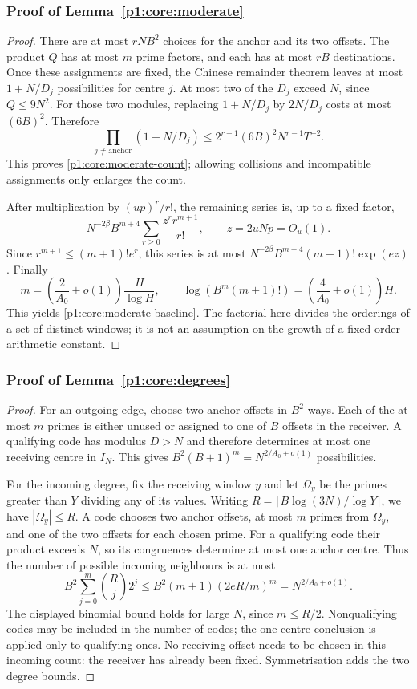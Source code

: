 \subsubsection{Proof of Lemma~\ref{p1:core:moderate}}
\label{p14:comp:certificate-moderate}

\begin{proof}
There are at most $rNB^2$ choices for the anchor and its two offsets.
The product $Q$ has at most $m$ prime factors, and each has at most
$rB$ destinations. Once these assignments are fixed, the Chinese
remainder theorem leaves at most $1+N/D_j$ possibilities for centre
$j$. At most two of the $D_j$ exceed $N$, since $Q\le9N^2$.
For those two modules, replacing $1+N/D_j$ by $2N/D_j$ costs at most
$(6B)^2$. Therefore
\[
 \prod_{j\ne\mathrm{anchor}}(1+N/D_j)
 \le 2^{r-1}(6B)^2N^{r-1}T^{-2}.
\]
This proves \eqref{p1:core:moderate-count}; allowing collisions and
incompatible assignments only enlarges the count.

After multiplication by $(up)^r/r!$, the remaining series is, up to
a fixed factor,
\[
 N^{-2\beta}B^{m+4}\sum_{r\ge0}\frac{z^r r^{m+1}}{r!},
 \qquad z=2uNp=O_u(1).
\]
Since $r^{m+1}\le(m+1)!e^r$, this series is at most
$N^{-2\beta}B^{m+4}(m+1)!\exp(ez)$. Finally
\[
 m=\left(\frac2{A_0}+o(1)\right)\frac{H}{\log H},\qquad
 \log(B^m(m+1)!)=\left(\frac4{A_0}+o(1)\right)H.
\]
This yields \eqref{p1:core:moderate-baseline}. The factorial here
divides the orderings of a set of distinct windows; it is not an
assumption on the growth of a fixed-order arithmetic constant.
\end{proof}

\subsubsection{Proof of Lemma~\ref{p1:core:degrees}}
\label{p14:comp:certificate-degrees}

\begin{proof}
For an outgoing edge, choose two anchor offsets in $B^2$ ways. Each of
the at most $m$ primes is either unused or assigned to one of $B$
offsets in the receiver. A qualifying code has modulus $D>N$ and
therefore determines at most one receiving centre in $I_N$. This gives
$B^2(B+1)^m=N^{2/A_0+o(1)}$ possibilities.

For the incoming degree, fix the receiving window $y$ and let
$\Omega_y$ be the primes greater than $Y$ dividing any of its values.
Writing $R=\lceil B\log(3N)/\log Y\rceil$, we have $|\Omega_y|\le R$.
A code chooses two anchor offsets, at most $m$ primes from $\Omega_y$,
and one of the two offsets for each chosen prime. For a qualifying
code their product exceeds $N$, so its congruences determine at most
one anchor centre. Thus the number of possible incoming neighbours is
at most
\[
 B^2\sum_{j=0}^m\binom Rj2^j
 \le B^2(m+1)(2eR/m)^m
 =N^{2/A_0+o(1)}.
\]
The displayed binomial bound holds for large $N$, since $m\le R/2$.
Nonqualifying codes may be included in the number of codes; the
one-centre conclusion is applied only to qualifying ones. No receiving
offset needs to be chosen in this incoming count: the receiver has
already been fixed. Symmetrisation adds the two degree bounds.
\end{proof}

